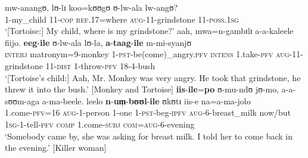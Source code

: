 \begin{exe}
\ex \label{exPRSPFVsequence1}
\gll mw-anangʊ, lʊ-lɪ koo=kʊʊgʊ ʊ-lw-ala lw-angʊ?\\
1-my\_child 11-\textsc{cop} \textsc{ref}.17=where \textsc{aug}-11-grindstone 11-\textsc{poss.1sg}\\
\glt `[Tortoise:] My child, where is my grindstone?'
\sn \gll aah, mwa=n-gambɪlɪ a-a-kaleele fiijo. \textbf{eeg}-\textbf{ile} ʊ-lw-ala lʊ-la, \textbf{a}-\textbf{taag}-\textbf{ile} m-mi-syanjʊ\\
 \textsc{interj} matronym=9-monkey 1-\textsc{pst}-be(come)\_angry.\textsc{pfv} \textsc{intens} 1.take-\textsc{pfv} \textsc{aug}-11-grindstone 11-\textsc{dist} 1-throw-\textsc{pfv} 18-4-bush\\
\glt \lq [Tortoise's child:] Aah, Mr. Monkey was very angry. He took that grindstone, he threw it into the bush.' [Monkey and Tortoise]
\ex \label{exPRSPFVsequence2} \gll \textbf{iis}-\textbf{ile}=\textbf{po} ʊ-mu-ndʊ jʊ-mo, a-a-sʊʊm-aga a-ma-beele. leelo \textbf{n}-\textbf{um̩}-\textbf{bʊʊl}-\textbf{ile} ʊkʊtɪ iis-e na=a-ma-jolo\\
1.come-\textsc{pfv}=16 \textsc{aug}-1-person 1-one 1-\textsc{pst}-beg-\textsc{ipfv} \textsc{aug}-6-breast\_milk now/but \textsc{1sg}-1-tell-\textsc{pfv} \textsc{comp} 1.come-\textsc{subj} \textsc{com}=\textsc{aug}-6-evening\\
\glt `Somebody came by, she was asking for breast milk. I told her to come back in the evening.' [Killer woman]
\end{exe} 

